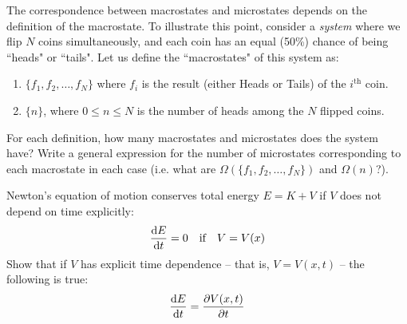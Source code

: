 \bigskip {}
The correspondence between macrostates and microstates
depends on the definition of the macrostate.
To illustrate this point, consider a {\sl system}
where we flip $N$ coins simultaneously, 
and each coin has an equal (50\%) chance of being ``heads" or ``tails".
Let us define the ``macrostates" of this system as:
\begin{enumerate}
\item $\{f_1, f_2, \ldots, f_N \}$ where $f_i$ is the result 
      (either Heads or Tails) of the $i^{\text{th}}$ coin. 
\item $\{n\}$, where $0 \leq n \leq N$ is the number of heads 
      among the $N$ flipped coins. 
\end{enumerate}

\noindent For each definition,
how many macrostates and microstates 
does the system have?
Write a general expression for the number of microstates
corresponding to each macrostate in each case
(i.e. what are $\Omega(\{f_1, f_2, \ldots, f_N \})$ and $\Omega(n)$?).








\bigskip {}
Newton's equation of motion conserves total energy $E = K + V$ 
if $V$ does not depend on time explicitly:
\[ \frac{{\rm d} E}{{\rm d}t} = 0\quad \text{if} \quad V = V(x) \]
Show that if $V$ has explicit time dependence
-- that is, $V = V(x,t)$ --
the following is true:
\[\frac{{\rm d} E}{{\rm d}t} = \frac{\partial V(x,t)}{\partial t}\]

